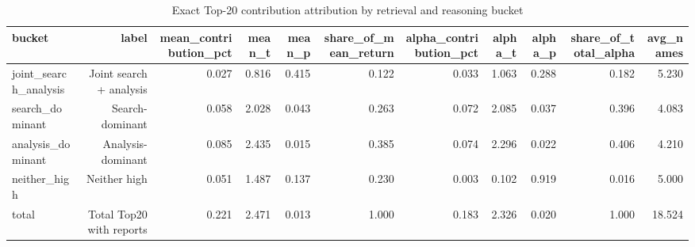 \begin{table}[!htbp]\centering
\caption{Exact Top-20 contribution attribution by retrieval and reasoning bucket}
\label{tab:deep_rr_attribution}
\begin{tabular}{lrrrrrrrrrr}
\toprule
bucket & label & mean\_contribution\_pct & mean\_t & mean\_p & share\_of\_mean\_return & alpha\_contribution\_pct & alpha\_t & alpha\_p & share\_of\_total\_alpha & avg\_names \\
\midrule
joint\_search\_analysis & Joint search + analysis & 0.027 & 0.816 & 0.415 & 0.122 & 0.033 & 1.063 & 0.288 & 0.182 & 5.230 \\
search\_dominant & Search-dominant & 0.058 & 2.028 & 0.043 & 0.263 & 0.072 & 2.085 & 0.037 & 0.396 & 4.083 \\
analysis\_dominant & Analysis-dominant & 0.085 & 2.435 & 0.015 & 0.385 & 0.074 & 2.296 & 0.022 & 0.406 & 4.210 \\
neither\_high & Neither high & 0.051 & 1.487 & 0.137 & 0.230 & 0.003 & 0.102 & 0.919 & 0.016 & 5.000 \\
total & Total Top20 with reports & 0.221 & 2.471 & 0.013 & 1.000 & 0.183 & 2.326 & 0.020 & 1.000 & 18.524 \\
\bottomrule
\end{tabular}
\end{table}
